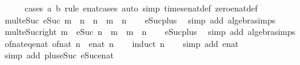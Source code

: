 \begin{isabellebody}
\ \ \ \ \isamarkupfalse%
\ {\isacharparenleft}cases\ a\ b\ rule{\isacharcolon}\ enat{}{\isacharunderscore}cases{\isacharparenright}\ {\isacharparenleft}auto\ simp{\isacharcolon}\ times{\isacharunderscore}enat{\isacharunderscore}def\ zero{\isacharunderscore}enat{\isacharunderscore}def{\isacharparenright}\isanewline
{}\isamarkupfalse%
%
\endisatagproof
{\isafoldproof}%
%
\isadelimproof
\isanewline
%
\endisadelimproof
\isanewline
{}\isamarkupfalse%
\isanewline
\isanewline
{}\isamarkupfalse%
\ mult{\isacharunderscore}eSuc{\isacharcolon}\ {\isachardoublequoteopen}eSuc\ m\ {\isacharasterisk}\ n\ {\isacharequal}\ n\ {\isacharplus}\ m\ {\isacharasterisk}\ n{\isachardoublequoteclose}\isanewline
%
\isadelimproof
\ \ %
\endisadelimproof
%
\isatagproof
{}\isamarkupfalse%
\ eSuc{\isacharunderscore}plus{\isacharunderscore}{}\ \isamarkupfalse%
\ {\isacharparenleft}simp\ add{\isacharcolon}\ algebra{\isacharunderscore}simps{\isacharparenright}%
\endisatagproof
{\isafoldproof}%
%
\isadelimproof
\isanewline
%
\endisadelimproof
\isanewline
{}\isamarkupfalse%
\ mult{\isacharunderscore}eSuc{\isacharunderscore}right{\isacharcolon}\ {\isachardoublequoteopen}m\ {\isacharasterisk}\ eSuc\ n\ {\isacharequal}\ m\ {\isacharplus}\ m\ {\isacharasterisk}\ n{\isachardoublequoteclose}\isanewline
%
\isadelimproof
\ \ %
\endisadelimproof
%
\isatagproof
{}\isamarkupfalse%
\ eSuc{\isacharunderscore}plus{\isacharunderscore}{}\ \isamarkupfalse%
\ {\isacharparenleft}simp\ add{\isacharcolon}\ algebra{\isacharunderscore}simps{\isacharparenright}%
\endisatagproof
{\isafoldproof}%
%
\isadelimproof
\isanewline
%
\endisadelimproof
\isanewline
{}\isamarkupfalse%
\ of{\isacharunderscore}nat{\isacharunderscore}eq{\isacharunderscore}enat{\isacharcolon}\ {\isachardoublequoteopen}of{\isacharunderscore}nat\ n\ {\isacharequal}\ enat\ n{\isachardoublequoteclose}\isanewline
%
\isadelimproof
\ \ %
\endisadelimproof
%
\isatagproof
{}\isamarkupfalse%
\ {\isacharparenleft}induct\ n{\isacharparenright}\isanewline
\ \ \isamarkupfalse%
\ {\isacharparenleft}simp\ add{\isacharcolon}\ enat{\isacharunderscore}{}{\isacharparenright}\isanewline
\ \ \isamarkupfalse%
\ {\isacharparenleft}simp\ add{\isacharcolon}\ plus{\isacharunderscore}{}{\isacharunderscore}eSuc\ eSuc{\isacharunderscore}enat{\isacharparenright}\isanewline
\ \ \isamarkupfalse%

\end{isabellebody}
